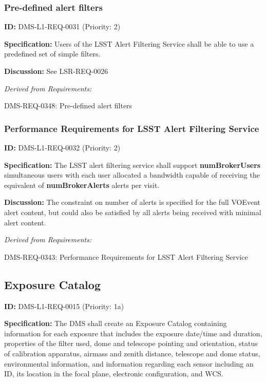 \documentclass[SE,toc,lsstdraft]{lsstdoc}
\begin{document}
\subsubsection{Pre-defined alert filters}

\label{DMS-L1-REQ-0031}
\textbf{ID:} DMS-L1-REQ-0031 (Priority: 2)

\textbf{Specification: }Users of the LSST Alert Filtering Service shall be able to use a predefined set of simple filters.

\textbf{Discussion:} See LSR-REQ-0026

\emph{Derived from Requirements:}

DMS-REQ-0348:
Pre-defined alert filters \newline

\subsubsection{Performance Requirements for LSST Alert Filtering Service}

\label{DMS-L1-REQ-0032}
\textbf{ID:} DMS-L1-REQ-0032 (Priority: 2)

\textbf{Specification:} The LSST alert filtering service shall support \textbf{numBrokerUsers} simultaneous users with each user allocated a bandwidth capable of receiving the equivalent of \textbf{numBrokerAlerts} alerts per visit.

\textbf{Discussion:} The constraint on number of alerts is specified for the full VOEvent alert content, but could also be satisfied by all alerts being received with minimal alert content.

\emph{Derived from Requirements:}

DMS-REQ-0343:
Performance Requirements for LSST Alert Filtering Service \newline

\subsection{Exposure Catalog}

\label{DMS-L1-REQ-0015}
\textbf{ID:} DMS-L1-REQ-0015 (Priority: 1a)

\textbf{Specification:} The DMS shall create an Exposure Catalog containing information for each exposure that includes the exposure date/time and duration, properties of the filter used, dome and telescope pointing and orientation, status of calibration apparatus, airmass and zenith distance, telescope and dome status, environmental information, and information regarding each sensor including an ID, its location in the focal plane, electronic configuration, and WCS.
\end{document}
